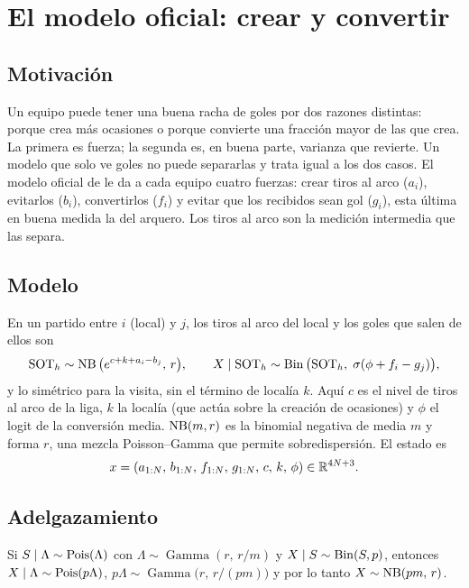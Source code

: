 \chapter{El modelo oficial: crear y convertir}
\label{cap:dos}

\section{Motivación}

Un equipo puede tener una buena racha de goles por dos razones distintas: porque crea más ocasiones o porque convierte una fracción mayor de las que crea. La primera es fuerza; la segunda es, en buena parte, varianza que revierte. Un modelo que solo ve goles no puede separarlas y trata igual a los dos casos. El modelo oficial de \cadlag le da a cada equipo cuatro fuerzas: crear tiros al arco ($a_i$), evitarlos ($b_i$), convertirlos ($f_i$) y evitar que los recibidos sean gol ($g_i$), esta última en buena medida la del arquero. Los tiros al arco son la medición intermedia que las separa.

\section{Modelo}

En un partido entre $i$ (local) y $j$, los tiros al arco del local y los goles que salen de ellos son
\begin{equation}
\mathrm{SOT}_h\sim\operatorname{NB}\big(e^{c+k+a_i-b_j},\,r\big),\qquad X\mid\mathrm{SOT}_h\sim\operatorname{Bin}\big(\mathrm{SOT}_h,\;\sigma(\phi+f_i-g_j)\big),
\label{eq:dos}
\end{equation}
y lo simétrico para la visita, sin el término de localía $k$. Aquí $c$ es el nivel de tiros al arco de la liga, $k$ la localía (que actúa sobre la creación de ocasiones) y $\phi$ el logit de la conversión media. $\operatorname{NB}(m,r)$ es la binomial negativa de media $m$ y forma $r$, una mezcla Poisson–Gamma que permite sobredispersión. El estado es
\[
x=(a_{1:N},\,b_{1:N},\,f_{1:N},\,g_{1:N},\,c,\,k,\,\phi)\in\mathbb{R}^{4N+3}.
\]

\section{Adelgazamiento}
\label{sec:adelgazamiento}

\begin{proposicion} \dem
Si $S\mid\Lambda\sim\operatorname{Pois}(\Lambda)$ con $\Lambda\sim\operatorname{Gamma}(r,\,r/m)$ y $X\mid S\sim\operatorname{Bin}(S,p)$, entonces $X\mid\Lambda\sim\operatorname{Pois}(p\Lambda)$, $p\Lambda\sim\operatorname{Gamma}\big(r,\,r/(pm)\big)$ y por lo tanto $X\sim\operatorname{NB}(pm,\,r)$.
\end{proposicion}

